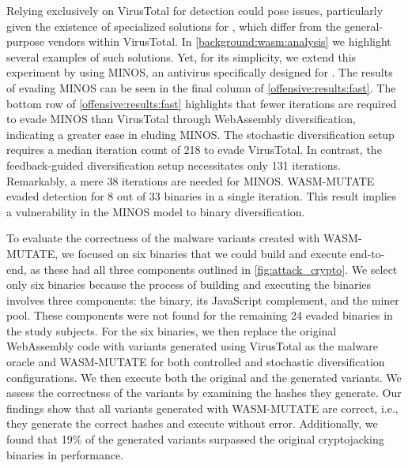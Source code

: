 \begin{strategy}
    \label{stochastic_div_minos}
    Relying exclusively on VirusTotal for detection could pose issues, particularly given the existence of specialized solutions for \Wasm, which differ from the general-purpose vendors within VirusTotal. 
    In \autoref{background:wasm:analysis} we highlight several examples of such solutions.
    Yet, for its simplicity, we extend this experiment by using MINOS\cite{MINOS}, an antivirus specifically designed for \Wasm. 
    The results of evading MINOS can be seen in the final column of \autoref{offensive:results:fast}.
    The bottom row of \autoref{offensive:results:fast} highlights that fewer iterations are required to evade MINOS than VirusTotal through WebAssembly diversification, indicating a greater ease in eluding MINOS.
    The stochastic diversification setup requires a median iteration count of 218 to evade VirusTotal. 
    In contrast, the feedback-guided diversification setup necessitates only 131 iterations. 
    Remarkably, a mere 38 iterations are needed for MINOS. 
    WASM-MUTATE evaded detection for 8 out of 33 binaries in a single iteration. 
    This result implies a vulnerability in the MINOS model to binary diversification.
\end{strategy}
    
\vspace{5mm}
\begin{strategy}
    \label{evasion_impact}
    To evaluate the correctness of the malware variants created with WASM-MUTATE, we focused on six binaries that we could build and execute end-to-end, as these had all three components outlined in \autoref{fig:attack_crypto}. 
    We select only six binaries because the process of building and executing the binaries involves three components: the \Wasm binary, its JavaScript complement, and the miner pool. 
    These components were not found for the remaining 24 evaded binaries in the study subjects.
    For the six binaries, we then replace the original WebAssembly code with variants generated using VirusTotal as the malware oracle and WASM-MUTATE for both controlled and stochastic diversification configurations. 
    We then execute both the original and the generated variants. 
    We assess the correctness of the variants by examining the hashes they generate.
    Our findings show that all variants generated with WASM-MUTATE are correct, i.e., they generate the correct hashes and execute without error.
    Additionally, we found that 19\% of the generated variants surpassed the original cryptojacking binaries in performance.
\end{strategy}

